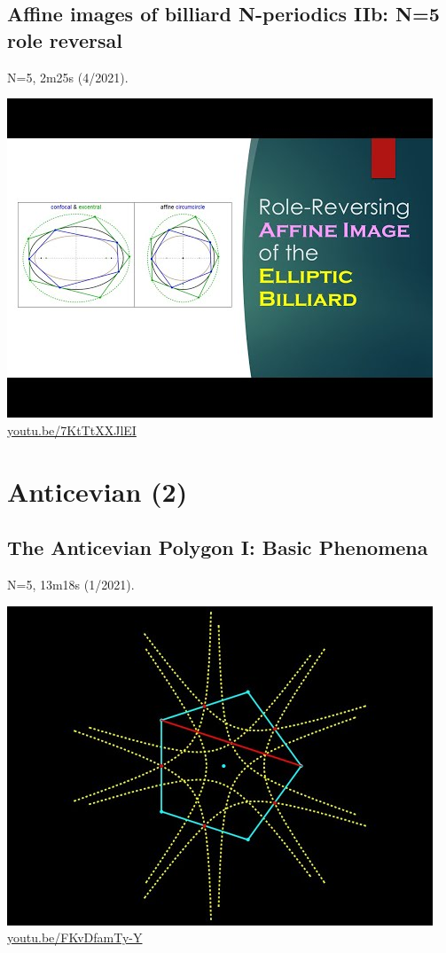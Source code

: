 \documentclass[12pt]{amsart}
\begin{document}
\subsection{Affine images of billiard N-periodics IIb: N=5 role reversal}
\label{vid:7KtTtXXJlEI}
\noindent N=5, 2m25s (4/2021). 
\begin{center}\includegraphics[width=.5\textwidth]{pics/7KtTtXXJlEI.jpg} \\ 
\href{https://youtu.be/7KtTtXXJlEI}{\url{youtu.be/7KtTtXXJlEI}}\end{center}
% 

\section{Anticevian (2)}

\subsection{The Anticevian Polygon I: Basic Phenomena}
\label{vid:FKvDfamTy-Y}
\noindent N=5, 13m18s (1/2021). 
\begin{center}\includegraphics[width=.5\textwidth]{pics/FKvDfamTy-Y.jpg} \\ 
\href{https://youtu.be/FKvDfamTy-Y}{\url{youtu.be/FKvDfamTy-Y}}\end{center}
% 
\end{document}
